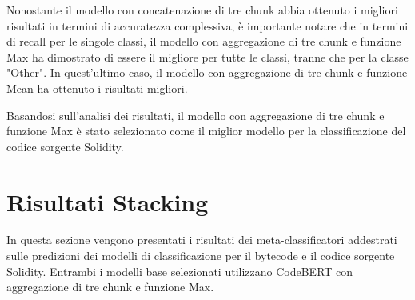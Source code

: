 \documentclass[../../Thesis.tex]{subfiles}
\begin{document}
Nonostante il modello con concatenazione di tre chunk abbia ottenuto i migliori risultati in termini di accuratezza complessiva, è importante notare che in termini di recall per le singole classi, il modello con aggregazione di tre chunk e funzione Max ha dimostrato di essere il migliore per tutte le classi, tranne che per la classe "Other". In quest'ultimo caso, il modello con aggregazione di tre chunk e funzione Mean ha ottenuto i risultati migliori.

Basandosi sull'analisi dei risultati, il modello con aggregazione di tre chunk e funzione Max è stato selezionato come il miglior modello per la classificazione del codice sorgente Solidity. 

\section{Risultati Stacking}
In questa sezione vengono presentati i risultati dei meta-classificatori addestrati sulle predizioni dei modelli di classificazione per il bytecode e il codice sorgente Solidity. Entrambi i modelli base selezionati utilizzano CodeBERT con aggregazione di tre chunk e funzione Max.\\
\end{document}
